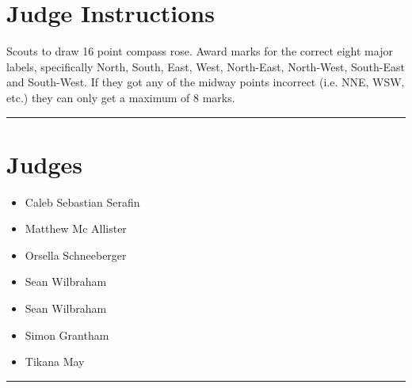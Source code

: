 \documentclass[10pt]{article}
\begin{document}
		\section*{Judge Instructions}
		Scouts to draw 16 point compass rose. Award marks for the correct eight major labels, specifically North, South, East, West, North-East, North-West, South-East and South-West. If they got any of the midway points incorrect (i.e. NNE, WSW, etc.) they can only get a maximum of 8 marks.
\vspace{0.5cm}
	\hrule
	\vspace{0.5cm}
		\section*{\faUsers \: Judges}

		

	\begin{multicols}{2}

		\begin{itemize}
									\item Caleb Sebastian Serafin
									\item Matthew Mc Allister
									\item Orsella Schneeberger
									\item Sean Wilbraham
						\end{itemize}

		\vfill\null
		\columnbreak

		\begin{itemize}
									\item Sean Wilbraham
									\item Simon Grantham
									\item Tikana May
						\end{itemize}

		\vfill\null

		\end{multicols}



			\vspace{0.5cm}
	\hrule
	\vspace{0.5cm}
\end{document}
